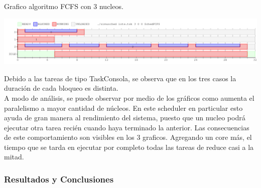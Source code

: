   Grafico algoritmo FCFS con 3 nucleos.
\vspace*{0.3cm} \vspace*{0.3cm}
  \begin{center}
 \includegraphics[scale=0.5]{ejercicio2-3nucleo.png}
 \end{center}
  \vspace*{0.3cm}

\indent Debido a las tareas de tipo TaskConsola, se observa que en los tres casos la duración 
de cada bloqueo es distinta.\\
\indent A modo de análisis, se puede observar por medio de los gráficos como aumenta el paralelismo a mayor cantidad de núcleos. 
En este scheduler en particular esto ayuda de gran manera al rendimiento del sistema, puesto que un nucleo podrá ejecutar otra tarea 
recién cuando haya terminado la anterior. Las consecuencias de este comportamiento son visibles en los 3 graficos. Agregando un core más, 
el tiempo que se tarda en ejecutar por completo todas las tareas de reduce casi a la mitad.\\


\subsubsection{Resultados y Conclusiones}
